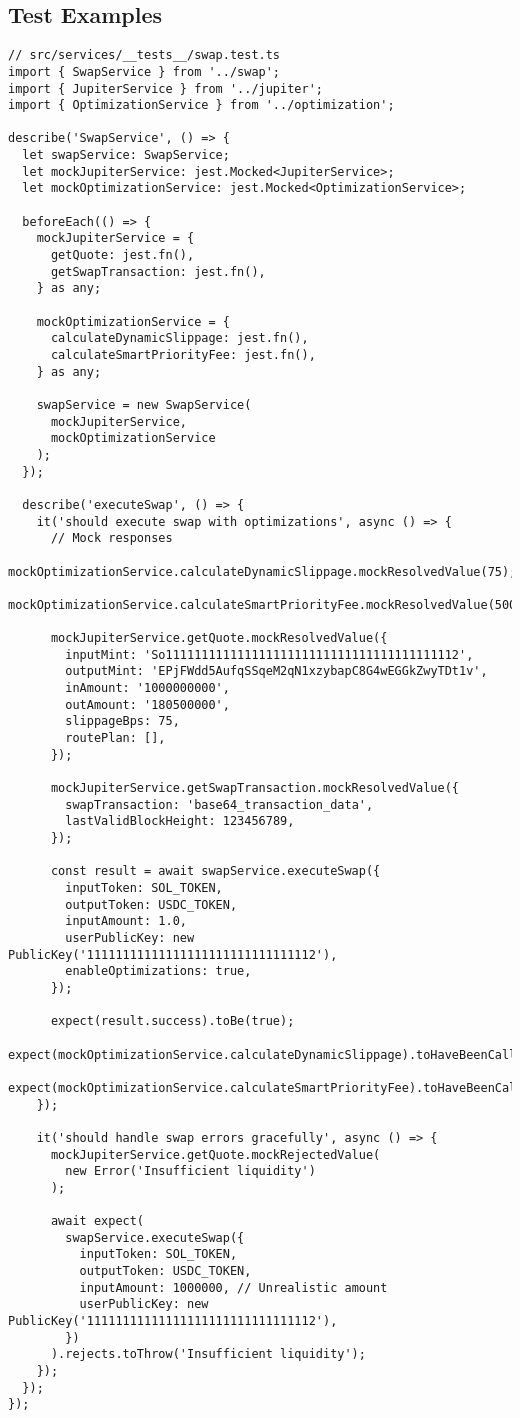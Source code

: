 \documentclass[11pt,a4paper]{article}
\begin{document}
\subsection{Test Examples}

\begin{lstlisting}[style=typescript, caption=Service Unit Tests]
// src/services/__tests__/swap.test.ts
import { SwapService } from '../swap';
import { JupiterService } from '../jupiter';
import { OptimizationService } from '../optimization';

describe('SwapService', () => {
  let swapService: SwapService;
  let mockJupiterService: jest.Mocked<JupiterService>;
  let mockOptimizationService: jest.Mocked<OptimizationService>;

  beforeEach(() => {
    mockJupiterService = {
      getQuote: jest.fn(),
      getSwapTransaction: jest.fn(),
    } as any;

    mockOptimizationService = {
      calculateDynamicSlippage: jest.fn(),
      calculateSmartPriorityFee: jest.fn(),
    } as any;

    swapService = new SwapService(
      mockJupiterService,
      mockOptimizationService
    );
  });

  describe('executeSwap', () => {
    it('should execute swap with optimizations', async () => {
      // Mock responses
      mockOptimizationService.calculateDynamicSlippage.mockResolvedValue(75);
      mockOptimizationService.calculateSmartPriorityFee.mockResolvedValue(5000);
      
      mockJupiterService.getQuote.mockResolvedValue({
        inputMint: 'So11111111111111111111111111111111111111112',
        outputMint: 'EPjFWdd5AufqSSqeM2qN1xzybapC8G4wEGGkZwyTDt1v',
        inAmount: '1000000000',
        outAmount: '180500000',
        slippageBps: 75,
        routePlan: [],
      });

      mockJupiterService.getSwapTransaction.mockResolvedValue({
        swapTransaction: 'base64_transaction_data',
        lastValidBlockHeight: 123456789,
      });

      const result = await swapService.executeSwap({
        inputToken: SOL_TOKEN,
        outputToken: USDC_TOKEN,
        inputAmount: 1.0,
        userPublicKey: new PublicKey('11111111111111111111111111111112'),
        enableOptimizations: true,
      });

      expect(result.success).toBe(true);
      expect(mockOptimizationService.calculateDynamicSlippage).toHaveBeenCalled();
      expect(mockOptimizationService.calculateSmartPriorityFee).toHaveBeenCalled();
    });

    it('should handle swap errors gracefully', async () => {
      mockJupiterService.getQuote.mockRejectedValue(
        new Error('Insufficient liquidity')
      );

      await expect(
        swapService.executeSwap({
          inputToken: SOL_TOKEN,
          outputToken: USDC_TOKEN,
          inputAmount: 1000000, // Unrealistic amount
          userPublicKey: new PublicKey('11111111111111111111111111111112'),
        })
      ).rejects.toThrow('Insufficient liquidity');
    });
  });
});
\end{lstlisting}
\end{document}
